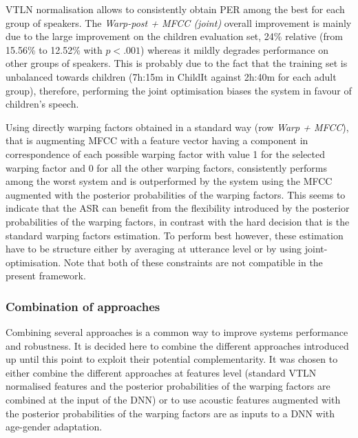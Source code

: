 \documentclass{nle}
\begin{document}
VTLN normalisation allows to consistently obtain PER among the best for each group of speakers. The {\em Warp-post + MFCC (joint)} overall improvement is mainly due to the large improvement on the children evaluation set, 24\% relative (from 15.56\% to 12.52\% with $p  <.001$) whereas it mildly degrades performance on other groups of speakers. This is probably due to the fact that the training set is unbalanced towards children (7h:15m in ChildIt against 2h:40m for each adult group), therefore, performing the joint optimisation biases the system in favour of children's speech.

Using directly warping factors obtained in a standard way  (row {\em Warp + MFCC}),  that is augmenting MFCC with a feature vector having a component in correspondence of  each possible warping factor with value 1 for the selected warping factor and 0 for all the other warping factors,  consistently performs among the worst system and is outperformed by the system using the MFCC augmented with the posterior probabilities of the warping factors. This seems to indicate that the ASR can benefit from the flexibility introduced by the posterior probabilities of the warping factors, in contrast with the hard decision that is the standard warping factors estimation. To perform best however, these estimation have to be structure either by averaging at utterance level or by using joint-optimisation. Note that both of these constraints are not compatible in the present framework.


\subsubsection{Combination of approaches}

%
%
Combining several approaches is a common way to improve systems performance and robustness. It is decided here to combine the different approaches introduced up until this point to exploit their potential complementarity. 
It was chosen to either combine the different approaches at features level (standard VTLN normalised features and the posterior probabilities of the warping factors are combined at the input of the DNN) or to use acoustic features augmented with the posterior probabilities of the warping factors are as inputs to a DNN with age-gender adaptation.
\end{document}
